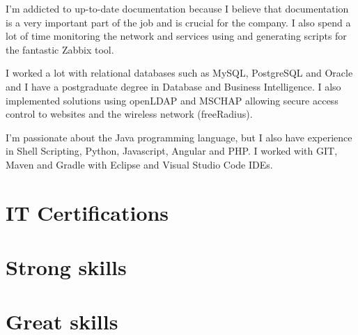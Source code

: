 \documentclass[11pt,a4paper,sans]{moderncv} %
\begin{document}
I'm addicted to up-to-date documentation because I believe that documentation is a very important part of the job and is crucial for the company. I also spend a lot of time monitoring the network and services using and generating scripts for the fantastic Zabbix tool.

I worked a lot with relational databases such as MySQL, PostgreSQL and Oracle and I have a postgraduate degree in Database and Business Intelligence. I also implemented solutions using openLDAP and MSCHAP allowing secure access control to websites and the wireless network (freeRadius).

I'm passionate about the Java programming language, but I also have experience in Shell Scripting, Python, Javascript, Angular and PHP. I worked with GIT, Maven and Gradle with Eclipse and Visual Studio Code IDEs. 

\section{IT Certifications}




\vspace{4em}

\section{Strong skills}


\section{Great skills}

\end{document}
